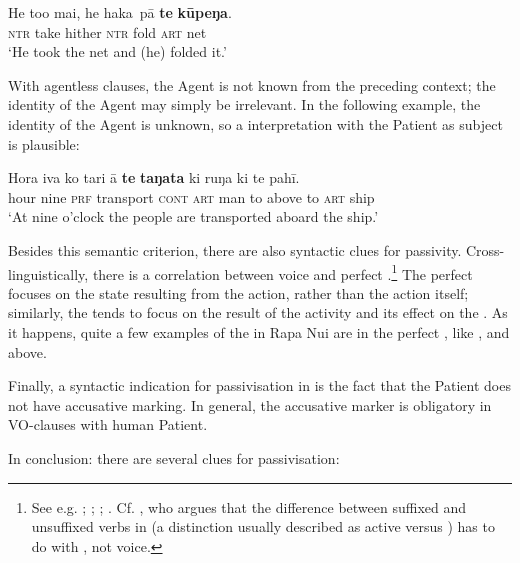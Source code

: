 
\ea\label{ex:8.57}
\gll He to{\ꞌ}o mai, he haka~pā \textbf{te} \textbf{kūpeŋa}. \\
\textsc{ntr} take hither \textsc{ntr} fold \textsc{art} net \\

\glt
‘He took the net and (he) folded it.’ \textstyleExampleref{[Mtx-3-01.171]}
\z

With agentless  clauses, the Agent is not known from the preceding context; the identity of the Agent may simply be irrelevant. In the following example, the identity of the Agent is unknown, so a  interpretation with the Patient as subject is plausible:

\ea\label{ex:8.58}
\gll Hora iva ko tari {\ꞌ}ā \textbf{te} \textbf{taŋata} ki ruŋa ki te pahī.\\
hour nine \textsc{prf} transport \textsc{cont} \textsc{art} man to above to \textsc{art} ship\\

\glt
‘At nine o’clock the people are transported aboard the ship.’ \textstyleExampleref{[R210.037]} 
\z

Besides this semantic criterion, there are also syntactic clues for passivity. Cross-linguistically, there is a correlation between  voice and perfect .\footnote{\label{fn:415}See e.g. \citet[84]{Comrie1976}; \citet[382]{Foley2007}; \citet[340]{KeenanDryer2007}; \citet[219]{Dixon2012}. Cf. \citet{Milner1973}, who argues that the difference between suffixed and unsuffixed verbs in  (a distinction usually described as active versus ) has to do with , not voice.} The perfect  focuses on the state resulting from the action, rather than the action itself; similarly, the  tends to focus on the result of the activity and its effect on the . As it happens, quite a few examples of the  in Rapa Nui are in the perfect , like ,  and  above.

Finally, a syntactic indication for passivisation in  is the fact that the Patient does not have accusative marking. In general, the accusative marker is obligatory in VO-clauses with human Patient.

\newpage 
In conclusion: there are several clues for passivisation:

